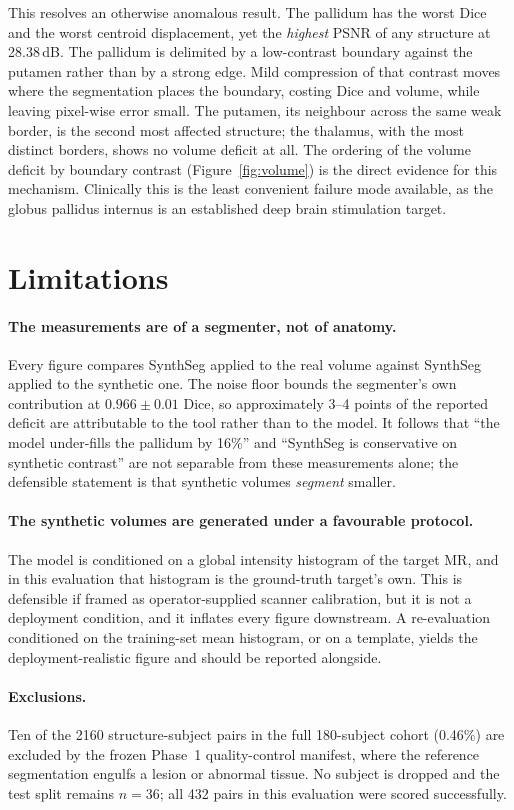 \documentclass[11pt]{article}
\begin{document}
This resolves an otherwise anomalous result. The pallidum has the worst Dice and
the worst centroid displacement, yet the \emph{highest} PSNR of any structure at
28.38\,dB. The pallidum is delimited by a low-contrast boundary against the
putamen rather than by a strong edge. Mild compression of that contrast moves
where the segmentation places the boundary, costing Dice and volume, while
leaving pixel-wise error small. The putamen, its neighbour across the same weak
border, is the second most affected structure; the thalamus, with the most
distinct borders, shows no volume deficit at all. The ordering of the volume
deficit by boundary contrast (Figure~\ref{fig:volume}) is the direct evidence for
this mechanism. Clinically this is the least convenient failure mode available,
as the globus pallidus internus is an established deep brain stimulation target.

\section{Limitations}

\paragraph{The measurements are of a segmenter, not of anatomy.}
Every figure compares SynthSeg applied to the real volume against SynthSeg
applied to the synthetic one. The noise floor bounds the segmenter's own
contribution at $0.966\pm0.01$ Dice, so approximately 3--4 points of the reported
deficit are attributable to the tool rather than to the model. It follows that
``the model under-fills the pallidum by 16\%'' and ``SynthSeg is conservative on
synthetic contrast'' are not separable from these measurements alone; the
defensible statement is that synthetic volumes \emph{segment} smaller.

\paragraph{The synthetic volumes are generated under a favourable protocol.}
The model is conditioned on a global intensity histogram of the target MR, and in
this evaluation that histogram is the ground-truth target's own. This is
defensible if framed as operator-supplied scanner calibration, but it is not a
deployment condition, and it inflates every figure downstream. A re-evaluation
conditioned on the training-set mean histogram, or on a template, yields the
deployment-realistic figure and should be reported alongside.

\paragraph{Exclusions.}
Ten of the 2160 structure-subject pairs in the full 180-subject cohort (0.46\%)
are excluded by the frozen Phase~1 quality-control manifest, where the reference
segmentation engulfs a lesion or abnormal tissue. No subject is dropped and the
test split remains $n=36$; all 432 pairs in this evaluation were scored
successfully.
\end{document}

